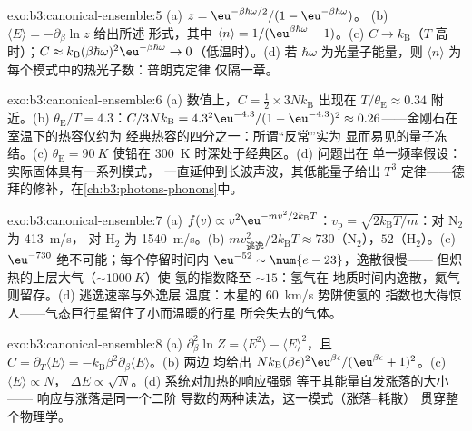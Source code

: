 \begin{solution}{exo:b3:canonical-ensemble:5}
(a) $z = \eu^{-\beta\hbar\omega/2}/(1 - \eu^{-\beta\hbar\omega})$。
(b) $\langle E\rangle = -\partial_\beta\ln z$ 给出所述
形式，其中 $\langle n\rangle = 1/(\eu^{\beta\hbar\omega} - 1)$。(c)
$C \to k_{\text{B}}$（$T$ 高时）；$C \approx k_{\text{B}}(\beta
\hbar\omega)^2\eu^{-\beta\hbar\omega} \to 0$（低温时）。(d) 若
$\hbar\omega$ 为光量子能量，则 $\langle n\rangle$
为每个模式中的热光子数：普朗克定律
仅隔一章。
\end{solution}

\begin{solution}{exo:b3:canonical-ensemble:6}
(a) 数值上，$C = \tfrac12 \times 3Nk_{\text{B}}$ 出现在
$T/\theta_{\text{E}} \approx 0.34$ 附近。(b) $\theta_{\text{E}}/T =
4.3$：$C/3Nk_{\text{B}} = 4.3^2\eu^{-4.3}/(1 - \eu^{-4.3})^2
\approx 0.26$——金刚石在室温下的热容仅约为
经典热容的四分之一：所谓“反常”实为
显而易见的量子冻结。(c) $\theta_{\text{E}} = \qty{90}{K}$
使铅在 \qty{300}{K} 时深处于经典区。(d) 问题出在
单一频率假设：实际固体具有一系列模式，
一直延伸到长波声波，其低能量子给出 $T^3$
定律——德拜的修补，在\cref{ch:b3:photons-phonons}中。
\end{solution}

\begin{solution}{exo:b3:canonical-ensemble:7}
(a) $f(v) \propto v^2\eu^{-mv^2/2k_{\text{B}}T}$：$v_{\text{p}} =
\sqrt{2k_{\text{B}}T/m}$：对 N$_2$ 为 \qty{413}{m/s}，
对 H$_2$ 为 \qty{1540}{m/s}。(b) $mv_{\text{逃逸}}^2/2k_{\text{B}}T
\approx 730$（N$_2$），$52$（H$_2$）。(c) $\eu^{-730}$
绝不可能；每个停留时间内 $\eu^{-52} \sim \num{e-23}$，逸散很慢——
但炽热的上层大气（$\sim\qty{1000}{K}$）使
氢的指数降至 $\sim15$：氢气在
地质时间内逸散，氮气则留存。(d) 逃逸速率与外逸层
温度：木星的 \qty{60}{km/s} 势阱使氢的
指数也大得惊人——气态巨行星留住了小而温暖的行星
所会失去的气体。
\end{solution}

\begin{solution}{exo:b3:canonical-ensemble:8}
(a) $\partial_\beta^2\ln Z = \langle E^2\rangle - \langle
E\rangle^2$，且 $C = \partial_T\langle E\rangle =
-k_{\text{B}}\beta^2\partial_\beta\langle E\rangle$。(b) 两边
均给出 $Nk_{\text{B}}(\beta\epsilon)^2\eu^{\beta\epsilon}/(
\eu^{\beta\epsilon} + 1)^2$。(c) $\langle E\rangle \propto N$，
$\Delta E \propto \sqrt N$。(d) 系统对加热的响应强弱
等于其能量自发涨落的大小——
响应与涨落是同一个二阶
导数的两种读法，这一模式（涨落–耗散）
贯穿整个物理学。
\end{solution}

